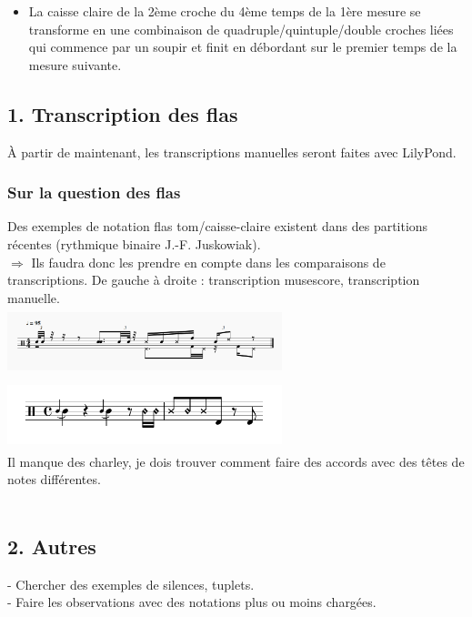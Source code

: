 \begin{itemize}
	\item La caisse claire de la 2ème croche du 4ème temps de la 1ère mesure se transforme en une combinaison de quadruple/quintuple/double croches liées qui commence par un soupir et finit en débordant sur le premier temps de la mesure suivante. 
\end{itemize}
\newpage
\subsection*{1. Transcription des flas}
À partir de maintenant, les transcriptions manuelles seront faites avec LilyPond.
\subsubsection{Sur la question des flas}
Des exemples de notation flas tom/caisse-claire existent dans des partitions récentes (rythmique binaire J.-F. Juskowiak).\\
$\Rightarrow$ Ils faudra donc les prendre en compte dans les comparaisons de transcriptions.
De gauche à droite : transcription musescore, transcription manuelle.\\
\includegraphics[height=20mm, width=80mm]{images/transcriptions_manuelles/1_transcriptions_flas/124_funk_95_fill_4-4_0.png}
\includegraphics[height=20mm, width=80mm]{images/transcriptions_manuelles/1_transcriptions_flas/124_funk_95_fill_4-4_1.png}\\
Il manque des charley, je dois trouver comment faire des accords avec des têtes de notes différentes.\\\\
\subsection*{2. Autres}
- Chercher des exemples de silences, tuplets.\\
- Faire les observations avec des notations plus ou moins chargées.